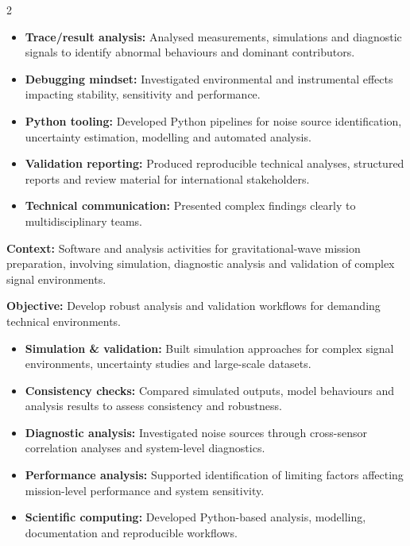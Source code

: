 \documentclass[8pt,a4paper,ragged2e,withhyper]{altacv}
\begin{document}
\begin{paracol}{2}
\begin{itemize}
  \item \textbf{Trace/result analysis:} Analysed measurements, simulations and diagnostic signals to identify abnormal behaviours and dominant contributors.
  \item \textbf{Debugging mindset:} Investigated environmental and instrumental effects impacting stability, sensitivity and performance.
  \item \textbf{Python tooling:} Developed Python pipelines for noise source identification, uncertainty estimation, modelling and automated analysis.
  \item \textbf{Validation reporting:} Produced reproducible technical analyses, structured reports and review material for international stakeholders.
  \item \textbf{Technical communication:} Presented complex findings clearly to multidisciplinary teams.
\end{itemize}

\divider


\textbf{Context:} Software and analysis activities for gravitational-wave mission preparation, involving simulation, diagnostic analysis and validation of complex signal environments.

\textbf{Objective:} Develop robust analysis and validation workflows for demanding technical environments.

\begin{itemize}
  \item \textbf{Simulation \& validation:} Built simulation approaches for complex signal environments, uncertainty studies and large-scale datasets.
  \item \textbf{Consistency checks:} Compared simulated outputs, model behaviours and analysis results to assess consistency and robustness.
  \item \textbf{Diagnostic analysis:} Investigated noise sources through cross-sensor correlation analyses and system-level diagnostics.
  \item \textbf{Performance analysis:} Supported identification of limiting factors affecting mission-level performance and system sensitivity.
  \item \textbf{Scientific computing:} Developed Python-based analysis, modelling, documentation and reproducible workflows.
\end{itemize}


\end{paracol}
\end{document}
